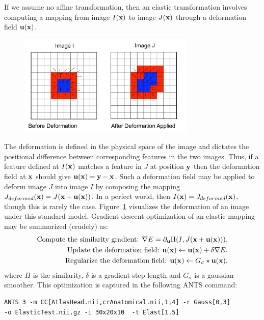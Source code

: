 \documentclass{InsightArticle}
\newcommand{\x}{{\bf x}}
\newcommand{\y}{{\bf y}}
\newcommand{\disp}{{\bf u}}
\begin{document}
 If we assume no affine transformation, then 
an elastic transformation involves computing a mapping from image $I(\x)$ to image $J(\x)$ 
through a deformation field $\disp( \x )$.  
\begin{figure}
\center \includegraphics[width=0.75\textwidth]{./Figures/PullBack.pdf} 
\label{fig:pull}
\end{figure}  
The deformation is defined in the physical space of the image 
and dictates the positional difference between corresponding features in the two images.  
Thus, if a feature defined at $I(\x)$ matches a feature in $J$ at position $\y$ then the deformation 
field at $\x$ should give $\disp ( \x )=\y-\x$.   
Such a deformation field may be applied to deform 
image $J$ into image $I$ by composing the mapping $J_{deformed}(\x)=J(\x+\disp(\x))$.  
In a perfect world, then $I(\x)=J_{deformed}(\x)$, though this is rarely the case.  Figure~\ref{fig:pull} 
visualizes the deformation of an image under this standard model. 
Gradient descent optimization of an elastic mapping may be summarized (crudely) as: 
\begin{align}
\text{Compute the similarity gradient:   }  \nabla E = \partial_{\disp} \Pi(I,J(\x+\disp(\x))). \nonumber \\
\text{Update the deformation field:  }  \disp(\x) \leftarrow \disp(\x)+\delta \nabla E. \nonumber \\ 
\text{Regularize the deformation field:  }  \disp(\x) \leftarrow G_\sigma \star \disp(\x),
\end{align}
where $\Pi$ is the similarity, $\delta$ is a gradient step length and $G_\sigma$ is a gaussian smoother.
This optimization is captured in the following ANTS command:
\begin{verbatim}
ANTS 3 -m CC[AtlasHead.nii,crAnatomical.nii,1,4] -r Gauss[0,3]  
-o ElasticTest.nii.gz -i 30x20x10  -t Elast[1.5] 
\end{verbatim}
\end{document}
